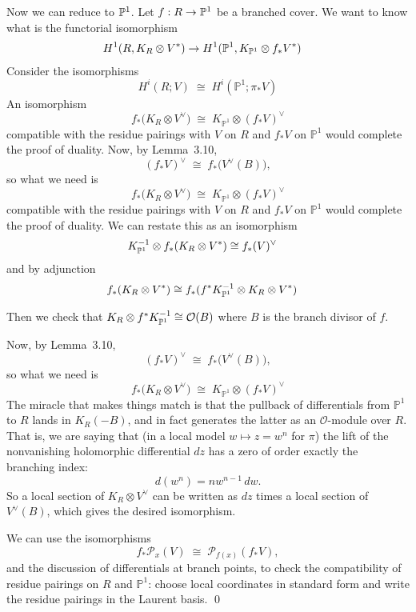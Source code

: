 \documentclass[12pt]{article}
\begin{document}
Now we can reduce to $\P^1$. Let $f: R \to \P^1$ be a branched cover. We want to know what is the functorial isomorphism \begin{align*}
    H^1(R, K_R \otimes V^*) & \to H^1(\P^1, K_{\P^1} \otimes f_* V^*)
\end{align*} Consider the isomorphisms
\[
H^i(R;V) \;\cong\; H^i(\mathbb{P}^1;\pi_*V)
\]
An isomorphism
\[
f_*\bigl(K_R \otimes V^\vee\bigr)
\;\cong\;
K_{\mathbb{P}^1} \otimes (f_*V)^\vee
\]
compatible with the residue pairings with $V$ on $R$ and $f_*V$ on $\mathbb{P}^1$
would complete the proof of duality. Now, by Lemma~3.10,
\[
(f_*V)^\vee \;\cong\; f_*\bigl(V^\vee(B)\bigr),
\]
so what we need is
\[
f_*\bigl(K_R \otimes V^\vee\bigr)
\;\cong\;
K_{\mathbb{P}^1} \otimes (f_*V)^\vee
\]
compatible with the residue pairings with $V$ on $R$ and $f_*V$ on $\mathbb{P}^1$
would complete the proof of duality. We can restate this as an isomorphism 
\begin{align*}
    K_{\P^1}^{-1} \otimes f_*(K_R \otimes V^*) & \cong f_*(V)^{\vee}
\end{align*} and by adjunction \begin{align*}
    f_*(K_R \otimes V^*) & \cong f_*(f^* K_{\P^1}^{-1} \otimes K_R \otimes V^*)
\end{align*}

Then we check that $K_R \otimes f^* K_{\P^1}^{-1} \cong \cO(B)$ where $B$ is the branch divisor of $f$.

Now, by Lemma~3.10,
\[
(f_*V)^\vee \;\cong\; f_*\bigl(V^\vee(B)\bigr),
\]
so what we need is
\[
f_*\bigl(K_R \otimes V^\vee\bigr)
\;\cong\;
K_{\mathbb{P}^1} \otimes (f_*V)^\vee
\]
The miracle that makes things match is that the pullback of differentials from
$\mathbb{P}^1$ to $R$ lands in $K_R(-B)$, and in fact generates the latter as an
$\mathcal{O}$-module over $R$. That is, we are saying that (in a local model
$w \mapsto z = w^n$ for $\pi$) the lift of the nonvanishing holomorphic differential
$dz$ has a zero of order exactly the branching index:
\[
d(w^n) = n w^{n-1} \, dw.
\]
So a local section of $K_R \otimes V^\vee$ can be written as $dz$ times a local
section of $V^\vee(B)$, which gives the desired isomorphism.

We can use the isomorphisms
\[
f_*\mathcal{P}_x(V) \;\cong\; \mathcal{P}_{f(x)}(f_*V),
\]
and the discussion of differentials at branch points, to check the compatibility of
residue pairings on $R$ and $\mathbb{P}^1$: choose local coordinates in standard
form and write the residue pairings in the Laurent basis.
\qed
\end{document}
